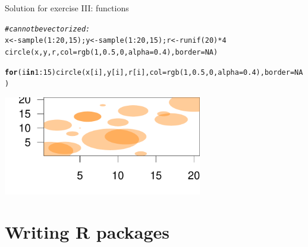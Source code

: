 \documentclass[xcolor=table,      handout ,    xcolor=dvipsnames]{beamer}\usepackage[]{graphicx}\usepackage[]{color}
\makeatletter
\newcommand{\hlnum}[1]{\textcolor[rgb]{0,0,0}{#1}}
\newcommand{\hlcom}[1]{\textcolor[rgb]{0,0.392,0}{\textit{#1}}}
\newcommand{\hlopt}[1]{\textcolor[rgb]{0,0,0}{#1}}
\newcommand{\hlstd}[1]{\textcolor[rgb]{0,0,0}{#1}}
\newcommand{\hlkwa}[1]{\textcolor[rgb]{1,0,0}{\textbf{#1}}}
\newcommand{\hlkwb}[1]{\textcolor[rgb]{0,0,0}{#1}}
\newcommand{\hlkwc}[1]{\textcolor[rgb]{1,0,1}{#1}}
\newcommand{\hlkwd}[1]{\textcolor[rgb]{0,0,1}{#1}}
\newenvironment{kframe}{%
 \def\at@end@of@kframe{}%
 \ifinner\ifhmode%
  \def\at@end@of@kframe{\end{minipage}}%
  \begin{minipage}{\columnwidth}%
 \fi\fi%
 \def\FrameCommand##1{\hskip\@totalleftmargin \hskip-\fboxsep
 \colorbox{shadecolor}{##1}\hskip-\fboxsep
     \hskip-\linewidth \hskip-\@totalleftmargin \hskip\columnwidth}%
 \MakeFramed {\advance\hsize-\width
   \@totalleftmargin\z@ \linewidth\hsize
   \@setminipage}}%
 {\par\unskip\endMakeFramed%
 \at@end@of@kframe}
\newenvironment{knitrout}{}{} %
\newcounter{exercisecount}
\makeatother
\begin{document}
\begin{frame}[fragile]{Solution for exercise  III: functions}
\begin{knitrout}\scriptsize
{}\color{fgcolor}\begin{kframe}
\begin{alltt}
\hlcom{# can not be vectorized:}
\hlstd{x} \hlkwb{<-} \hlkwd{sample}\hlstd{(}\hlnum{1}\hlopt{:}\hlnum{20}\hlstd{,} \hlnum{15}\hlstd{) ;  y} \hlkwb{<-} \hlkwd{sample}\hlstd{(}\hlnum{1}\hlopt{:}\hlnum{20}\hlstd{,} \hlnum{15}\hlstd{) ; r} \hlkwb{<-} \hlkwd{runif}\hlstd{(}\hlnum{20}\hlstd{)}\hlopt{*}\hlnum{4}
\hlkwd{circle}\hlstd{(x,y,r,} \hlkwc{col}\hlstd{=}\hlkwd{rgb}\hlstd{(}\hlnum{1}\hlstd{,}\hlnum{0.5}\hlstd{,}\hlnum{0}\hlstd{,}\hlkwc{alpha}\hlstd{=}\hlnum{0.4}\hlstd{),} \hlkwc{border}\hlstd{=}\hlnum{NA}\hlstd{)}
\end{alltt}


{\ttfamily\noindent\color{warningcolor}{\#\# Warning in circle(x, y, r, col = rgb(1, 0.5, 0, alpha = 0.4), border = NA): Only the first element of the vectors is used.}}\begin{alltt}
\hlkwa{for}\hlstd{(i} \hlkwa{in} \hlnum{1}\hlopt{:}\hlnum{15}\hlstd{)} \hlkwd{circle}\hlstd{(x[i],y[i],r[i],} \hlkwc{col}\hlstd{=}\hlkwd{rgb}\hlstd{(}\hlnum{1}\hlstd{,}\hlnum{0.5}\hlstd{,}\hlnum{0}\hlstd{,}\hlkwc{alpha}\hlstd{=}\hlnum{0.4}\hlstd{),} \hlkwc{border}\hlstd{=}\hlnum{NA}\hlstd{)}
\end{alltt}
\end{kframe}

{\centering \includegraphics[width=0.65\textwidth]{./fig/exfunsolc-1} 

}



\end{knitrout}
\end{frame}

\iffalse %

\section{Writing R packages}
\end{document}
